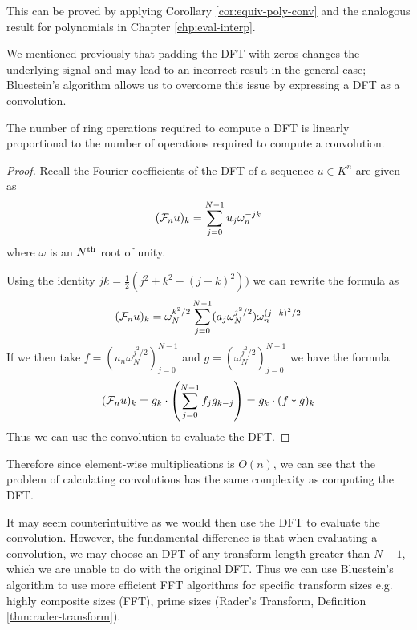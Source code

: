 This can be proved by applying Corollary \ref{cor:equiv-poly-conv} and the analogous result for polynomials in Chapter \ref{chp:eval-interp}.

We mentioned previously that padding the DFT with zeros changes the underlying signal and may lead to an incorrect result in the general case; Bluestein's algorithm allows us to overcome this issue by expressing a DFT as a convolution.

\begin{proposition}
    The number of ring operations required to compute a DFT is linearly proportional to the number of operations required to compute a convolution.
\end{proposition}

\begin{proof}
    Recall the Fourier coefficients of the DFT of a sequence $u \in K^n$ are given as
    \[
        (\mathcal F_n u)_k = \sum^{N-1}_{j=0} u_j\omega_n^{-jk}
    \]
    where $\omega$ is an $N^{\textrm{th}}$ root of unity.

    Using the identity $jk = \frac{1}{2}(j^2 + k^2 - (j - k)^2))$ we can rewrite the formula as
    \[
        (\mathcal F_n u)_k = \omega_N^{k^2/2} \sum^{N-1}_{j=0} (a_j \omega_N^{j^2/2}) \omega_n^{(j - k)^2/2}
    \]
    If we then take $f = (u_n \omega_N^{j^2/2})_{j=0}^{N-1}$ and $g = (\omega_N^{j^2/2})_{j=0}^{N-1}$ we have the formula
    \[
        (\mathcal F_n u)_k = g_k \cdot \left(\sum^{N-1}_{j=0} f_j g_{k-j}\right) = g_k \cdot (f \ast g)_k
    \]
    Thus we can use the convolution to evaluate the DFT.
\end{proof}

Therefore since element-wise multiplications is $O(n)$, we can see that the problem of calculating convolutions has the same complexity as computing the DFT.

It may seem counterintuitive as we would then use the DFT to evaluate the convolution. However, the fundamental difference is that when evaluating a convolution, we may choose an DFT of any transform length greater than $N - 1$, which we are unable to do with the original DFT. Thus we can use Bluestein's algorithm\cite{bluestein} to use more efficient FFT algorithms for specific transform sizes e.g. highly composite sizes (FFT), prime sizes (Rader's Transform, Definition \ref{thm:rader-transform}).

